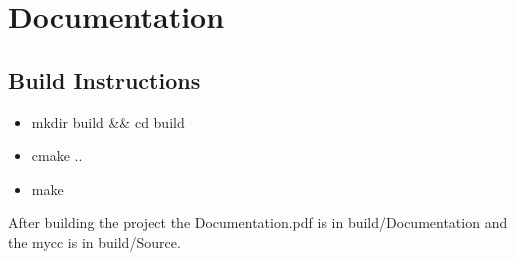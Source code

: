 \documentclass[a4paper,12pt,twoside]{book}
\begin{document}
\chapter{Documentation}
\section{Build Instructions}
    \begin{itemize}
       \item mkdir build \&\& cd build
       \item cmake ..
       \item make
    \end{itemize}

    After building the project the Documentation.pdf is in build/Documentation
    and the mycc is in build/Source.
\end{document}
